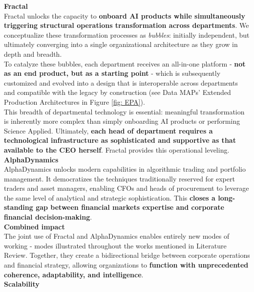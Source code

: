 \documentclass{article}
\begin{document}
\textbf{Fractal}\\

Fractal unlocks the capacity to \textbf{onboard AI products while simultaneously triggering structural operations transformation across departments}. We conceptualize these transformation processes as \textit{bubbles}: initially independent, but ultimately converging into a single organizational architecture as they grow in depth and breadth.\\

To catalyze these bubbles, each department receives an all-in-one platform - \textbf{not as an end product, but as a starting point} - which is subsequently customized and evolved into a design that is interoperable across departments and compatible with the legacy by construction (see Data MAPs’ Extended Production Architectures in Figure \ref{fig: EPA}).\\

This breadth of departmental technology is essential: meaningful transformation is inherently more complex than simply onboarding AI products or performing Science Applied. Ultimately, \textbf{each head of department requires a technological infrastructure as sophisticated and supportive as that available to the CEO herself}. Fractal provides this operational leveling.\\

\textbf{AlphaDynamics}\\

AlphaDynamics unlocks modern capabilities in algorithmic trading and portfolio management. It democratizes the techniques traditionally reserved for expert traders and asset managers, enabling CFOs and heads of procurement to leverage the same level of analytical and strategic sophistication. This \textbf{closes a long-standing gap between financial markets expertise and corporate financial decision-making}.\\

\textbf{Combined impact}\\

The joint use of Fractal and AlphaDynamics enables entirely new modes of working - modes illustrated throughout the works mentioned in Literature Review. Together, they create a bidirectional bridge between corporate operations and financial strategy, allowing organizations to \textbf{function with unprecedented coherence, adaptability, and intelligence}.\\

\textbf{Scalability}\\
\end{document}
